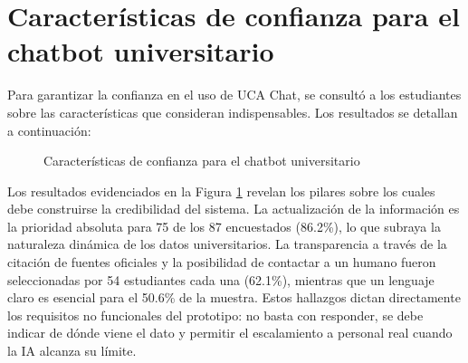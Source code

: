 {{\section{Características de confianza para el chatbot universitario}
Para garantizar la confianza en el uso de UCA Chat, se consultó a los estudiantes sobre las características que consideran indispensables. Los resultados se detallan a continuación:

\begin{figure}[H]
    \centering
    \caption{Características de confianza para el chatbot universitario}
    \label{fig:confianza_chatbot}
\end{figure}

Los resultados evidenciados en la Figura \ref{fig:confianza_chatbot} revelan los pilares sobre los cuales debe construirse la credibilidad del sistema. La actualización de la información es la prioridad absoluta para 75 de los 87 encuestados (86.2\%), lo que subraya la naturaleza dinámica de los datos universitarios. La transparencia a través de la citación de fuentes oficiales y la posibilidad de contactar a un humano fueron seleccionadas por 54 estudiantes cada una (62.1\%), mientras que un lenguaje claro es esencial para el 50.6\% de la muestra. Estos hallazgos dictan directamente los requisitos no funcionales del prototipo: no basta con responder, se debe indicar de dónde viene el dato y permitir el escalamiento a personal real cuando la IA alcanza su límite.

}}
